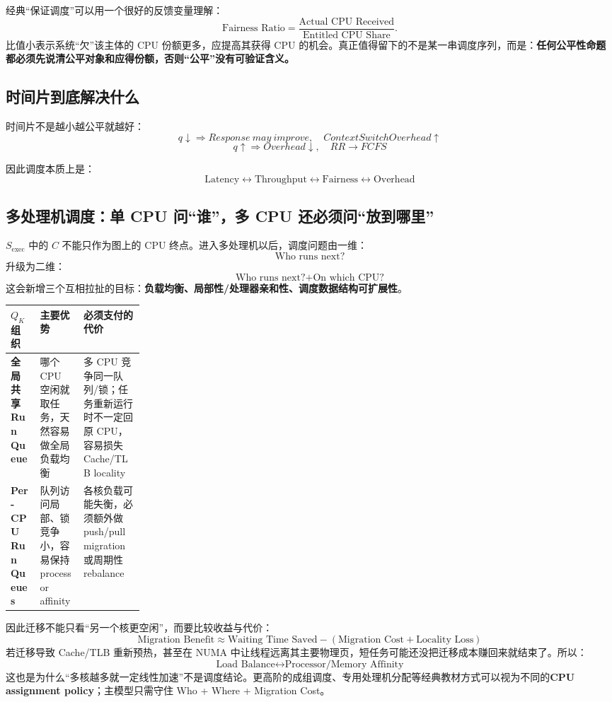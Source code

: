 \documentclass[11pt,a4paper]{ctexart}
\newcommand{\kw}[1]{\textbf{#1}}
\begin{document}
经典“保证调度”可以用一个很好的反馈变量理解：
\[
\text{Fairness Ratio}=\frac{\text{Actual CPU Received}}{\text{Entitled CPU Share}}.
\]
比值小表示系统“欠”该主体的 CPU 份额更多，应提高其获得 CPU 的机会。真正值得留下的不是某一串调度序列，而是：\kw{任何公平性命题都必须先说清公平对象和应得份额，否则“公平”没有可验证含义。}

\subsection{时间片到底解决什么}

时间片不是越小越公平就越好：
\[
q\downarrow\Rightarrow Response\ may\ improve,
\quad ContextSwitchOverhead\uparrow
\]
\[
q\uparrow\Rightarrow Overhead\downarrow,
\quad RR\rightarrow FCFS
\]

因此调度本质上是：
\[
\boxed{\text{Latency}\leftrightarrow\text{Throughput}\leftrightarrow\text{Fairness}\leftrightarrow\text{Overhead}}
\]

\subsection{多处理机调度：单 CPU 问“谁”，多 CPU 还必须问“放到哪里”}

$S_{\text{exec}}$ 中的 $C$ 不能只作为图上的 CPU 终点。进入多处理机以后，调度问题由一维：
\[
\boxed{\text{Who runs next?}}
\]
升级为二维：
\[
\boxed{\text{Who runs next?}+\text{On which CPU?}}
\]
这会新增三个互相拉扯的目标：\kw{负载均衡、局部性/处理器亲和性、调度数据结构可扩展性}。

\begingroup
\small
\renewcommand{\arraystretch}{1.22}
\setlength{\tabcolsep}{5pt}
\begin{tabularx}{\linewidth}{>{\bfseries}p{0.22\linewidth} X X}
\toprule
$Q_K$ 组织 & 主要优势 & 必须支付的代价\\
\midrule
全局共享 Run Queue & 哪个 CPU 空闲就取任务，天然容易做全局负载均衡 & 多 CPU 竞争同一队列/锁；任务重新运行时不一定回原 CPU，容易损失 Cache/TLB locality\\
Per-CPU Run Queues & 队列访问局部、锁竞争小，容易保持 processor affinity & 各核负载可能失衡，必须额外做 push/pull migration 或周期性 rebalance\\
\bottomrule
\end{tabularx}
\endgroup

因此迁移不能只看“另一个核更空闲”，而要比较收益与代价：
\[
\boxed{
\text{Migration Benefit}
\approx
\text{Waiting Time Saved}
-
(\text{Migration Cost}+\text{Locality Loss})
}
\]
若迁移导致 Cache/TLB 重新预热，甚至在 NUMA 中让线程远离其主要物理页，短任务可能还没把迁移成本赚回来就结束了。所以：
\[
\boxed{\text{Load Balance}\leftrightarrow\text{Processor/Memory Affinity}}
\]
这也是为什么“多核越多就一定线性加速”不是调度结论。更高阶的成组调度、专用处理机分配等经典教材方式可以视为不同的\kw{CPU assignment policy}；主模型只需守住 Who + Where + Migration Cost。
\end{document}
